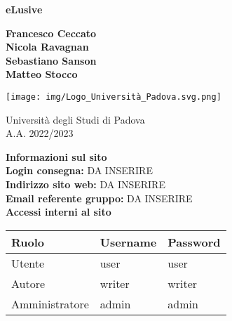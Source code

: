 \documentclass[11pt, a4paper]{article}
\begin{document}
\begin{titlepage}
    \begin{center}
        \vspace*{1cm}
            
        \Huge
        \textbf{eLusive}
            
        \vspace{1.5cm}
        
        \Large
        \textbf{Francesco Ceccato} \\
        \textbf{Nicola Ravagnan} \\
        \textbf{Sebastiano Sanson} \\
        \textbf{Matteo Stocco}
            
        \vfill
            
        \vspace{0.8cm}
            
       \texttt{[image: img/Logo\_Università\_Padova.svg.png]}
            
        \Large
        Università degli Studi di Padova \\
        A.A. 2022/2023
            
    \end{center}
\end{titlepage}


\clearpage

\begin{center}
	\textbf{\Large{Informazioni sul sito}}\\
	\textbf{Login consegna:} DA INSERIRE \\
	\textbf{Indirizzo sito web:} DA INSERIRE \url{}\\
	\textbf{Email referente gruppo:} DA INSERIRE \\
    \vspace{1cm}
    \textbf{Accessi interni al sito}
    \begin{longtable}{|l|l|l|}
        \hline
        \rowcolor[HTML]{220058}
        {\color[HTML]{FFFFFF} Ruolo} & {\color[HTML]{FFFFFF} Username} & {\color[HTML]{FFFFFF} Password} \\ \hline
        Utente         & user     & user    \\ \hline
        Autore         & writer   & writer  \\ \hline
        Amministratore & admin    & admin   \\ \hline
    \end{longtable}
\end{center}

\clearpage  

\tableofcontents

\clearpage











\end{document}
